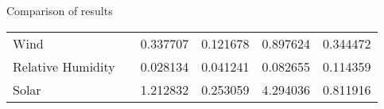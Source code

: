 \documentclass[xcolor=table]{beamer}
\begin{document}
\begin{frame}{Comparison of results}
{\begin{table}[]
\begin{tabular}{llllll}
\multicolumn{1}{|l|}{\cellcolor[HTML]{ECF4FF}Wind}              & \multicolumn{1}{l|}{} & \multicolumn{1}{l|}{0.337707}                           & \multicolumn{1}{l|}{0.121678}                            & \multicolumn{1}{l|}{0.897624}                          & \multicolumn{1}{l|}{0.344472}                           \\ \cline{1-1}
\multicolumn{1}{|l|}{\cellcolor[HTML]{ECF4FF}Relative Humidity} & \multicolumn{1}{l|}{} & \multicolumn{1}{l|}{0.028134}                           & \multicolumn{1}{l|}{0.041241}                            & \multicolumn{1}{l|}{0.082655}                          & \multicolumn{1}{l|}{0.114359}                           \\ \cline{1-1}
\multicolumn{1}{|l|}{\cellcolor[HTML]{ECF4FF}Solar}             & \multicolumn{1}{l|}{} & \multicolumn{1}{l|}{1.212832}                           & \multicolumn{1}{l|}{0.253059}                            & \multicolumn{1}{l|}{4.294036}                          & \multicolumn{1}{l|}{0.811916}                           \\ \cline{1-1} \cline{3-6} 
\end{tabular}
\end{table}}
\end{frame}
		
	


\end{document}
